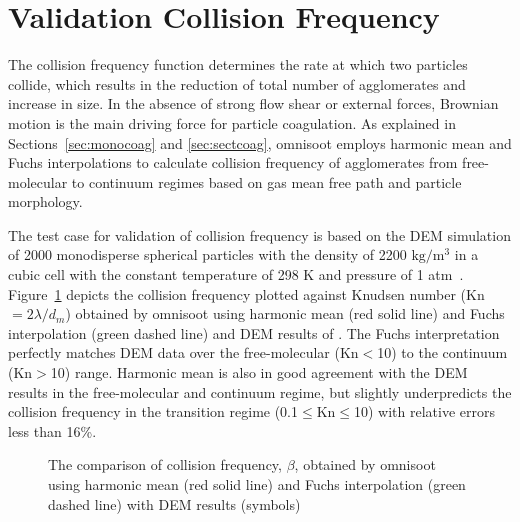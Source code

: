 \section{Validation Collision Frequency}
The collision frequency function determines the rate at which two particles collide, which results in the reduction of total number of agglomerates and increase in size. In the absence of strong flow shear or external forces, Brownian motion is the main driving force for particle coagulation. As explained in Sections~\ref{sec:monocoag} and \ref{sec:sectcoag}, omnisoot employs harmonic mean and Fuchs interpolations to calculate collision frequency of agglomerates from free-molecular to continuum regimes based on gas mean free path and particle morphology. 

The test case for validation of collision frequency is based on the DEM simulation of 2000 monodisperse spherical particles with the density of 2200 $\mathrm{kg/m^3}$ in
a cubic cell with the constant temperature of 298 K and pressure of 1 atm~\citep{goudeli2015coagulation}. Figure~\ref{fig:kernelvalid} depicts the collision frequency plotted against Knudsen number (Kn$=2\lambda/d_m$) obtained by omnisoot using harmonic mean (red solid line) and Fuchs interpolation (green dashed line) and DEM results of \citet{goudeli2015coagulation}. The Fuchs interpretation perfectly matches DEM data over the free-molecular (Kn$<$10) to the continuum (Kn$>$10) range. Harmonic mean is also in good agreement with the DEM results in the free-molecular and continuum regime, but slightly underpredicts the collision frequency in the transition regime (0.1$\le$Kn$\le$10) with relative errors less than 16\%.

\begin{figure}[H]
	\centering
	\caption{The comparison of collision frequency, $\beta$, obtained by omnisoot using harmonic mean (red solid line) and Fuchs interpolation (green dashed line) with DEM results (symbols)~\citep{goudeli2015coagulation}}
	\label{fig:kernelvalid} 
\end{figure}

